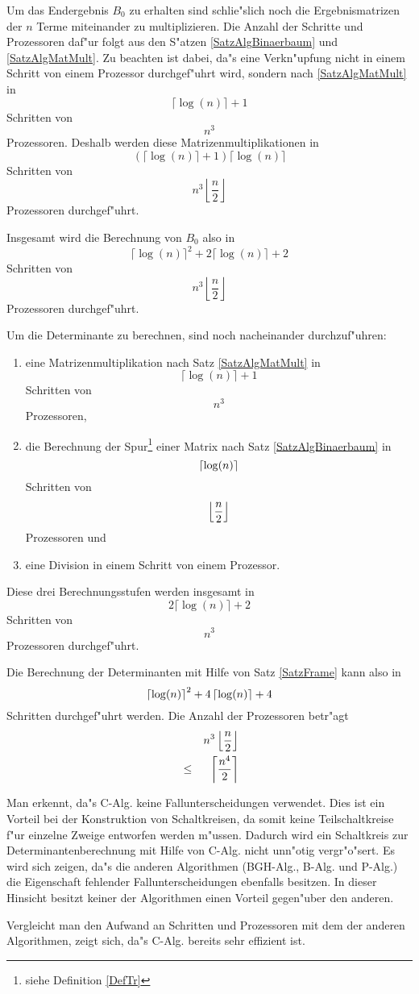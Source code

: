 Um das Endergebnis $B_0$ zu erhalten sind schlie"slich noch die
Ergebnismatrizen der $n$ Terme miteinander zu multiplizieren. Die
Anzahl der Schritte und Prozessoren daf"ur folgt aus den S"atzen
\ref{SatzAlgBinaerbaum} und \ref{SatzAlgMatMult}.
Zu beachten ist dabei,
da"s eine Verkn"upfung nicht in einem Schritt von
einem Prozessor durchgef"uhrt wird, sondern nach \ref{SatzAlgMatMult} in
\[ \lceil \log(n) \rceil + 1 \] Schritten von \[ n^3 \] Prozessoren.
Deshalb werden diese Matrizenmultiplikationen in
\[ (\lceil \log(n) \rceil + 1) \lceil \log(n) \rceil \] Schritten von
\[ n^3 \left\lfloor \frac{n}{2} \right\rfloor \] Prozessoren
durchgef"uhrt.

Insgesamt wird die Berechnung von $B_0$ also in
\[ \lceil \log(n) \rceil^2 + 2 \lceil \log(n) \rceil + 2 \] Schritten
von \[ n^3 \left\lfloor \frac{n}{2} \right\rfloor \] Prozessoren
durchgef"uhrt.

Um die Determinante zu berechnen, sind noch nacheinander durchzuf"uhren:
\begin{enumerate}
\item
      eine Matrizenmultiplikation nach Satz \ref{SatzAlgMatMult} in
      \[ \lceil \log(n) \rceil + 1 \] Schritten von \[ n^3 \] 
      Prozessoren,
\item 
      die Berechnung der Spur\footnote{siehe Definition
      \ref{DefTr} } einer Matrix nach Satz \ref{SatzAlgBinaerbaum} in
      \[ \left\lceil \log(n) \right\rceil \] Schritten von
      \[ \left\lfloor \frac{n}{2} \right\rfloor \]
      Prozessoren und
\item
      eine Division in einem Schritt von einem Prozessor.
\end{enumerate}
Diese drei Berechnungsstufen werden insgesamt in
\[ 2 \lceil \log(n) \rceil + 2 \] Schritten von \[ n^3 \] Prozessoren
durchgef"uhrt.

Die Berechnung der Determinanten mit Hilfe von Satz \ref{SatzFrame}
kann also in
\[ \left\lceil \log(n) \right\rceil^2 + 4 \left\lceil \log(n) \right\rceil + 4 \] Schritten
durchgef"uhrt werden. Die Anzahl der Prozessoren betr"agt
\begin{eqnarray*}
   &      & n^3 \left\lfloor \frac{n}{2} \right\rfloor
\\ & \leq & \left\lceil \frac{n^4}{2} \right\rceil
\end{eqnarray*}

Man erkennt, da"s C-Alg. keine Fallunterscheidungen verwendet. Dies ist
ein Vorteil bei der Konstruktion von Schaltkreisen, da somit keine
Teilschaltkreise f"ur einzelne Zweige entworfen werden m"ussen. Dadurch
wird ein Schaltkreis zur Determinantenberechnung mit Hilfe von C-Alg.
nicht unn"otig vergr"o"sert. Es wird sich zeigen, da"s die anderen
Algorithmen (BGH-Alg., B-Alg. und P-Alg.) die Eigenschaft fehlender 
Fallunterscheidungen ebenfalls besitzen. In dieser Hinsicht besitzt keiner
der Algorithmen einen Vorteil gegen"uber den anderen.

Vergleicht man den Aufwand an Schritten und Prozessoren mit dem der anderen
Algorithmen, zeigt sich, da"s C-Alg. bereits sehr effizient ist.

